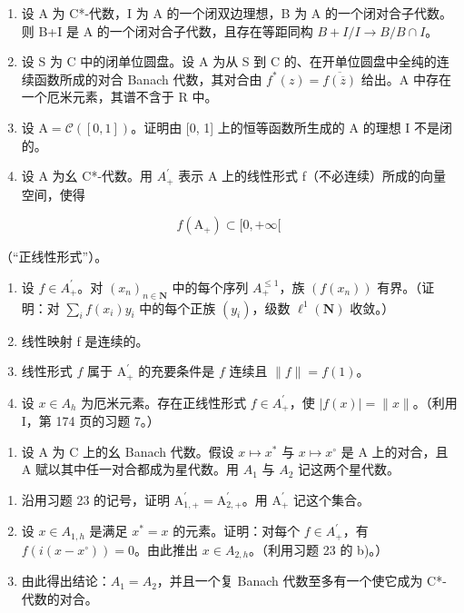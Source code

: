 \begin{enumerate}
\def\labelenumi{\arabic{enumi})}
\setcounter{enumi}{19}
\item
  设 A 为 C*-代数，I 为 A 的一个闭双边理想，B 为 A 的一个闭对合子代数。则 B+I 是 A 的一个闭对合子代数，且存在等距同构 \(B + I/I \rightarrow B/B \cap I\)。
\item
  设 S 为 C 中的闭单位圆盘。设 A 为从 S 到 C 的、在开单位圆盘中全纯的连续函数所成的对合 Banach 代数，其对合由 \(f^{*}(z) = \overline{f(\overline{z})}\) 给出。A 中存在一个厄米元素，其谱不含于 R 中。
\item
  设 \(\mathrm{A} = \mathcal{C}([0,1])\)。证明由 {[}0, 1{]} 上的恒等函数所生成的 A 的理想 I 不是闭的。
\item
  设 A 为幺 C*-代数。用 \(A_{+}^{\prime}\) 表示 A 上的线性形式 f（不必连续）所成的向量空间，使得
\end{enumerate}

\[
f (\mathrm{A} _ {+}) \subset [ 0, + \infty [
\]

（“正线性形式”）。

\begin{enumerate}
\def\labelenumi{\alph{enumi})}
\item
  设 \(f \in A_{+}^{\prime}\)。对 \((x_{n})_{n \in \mathbf{N}}\) 中的每个序列 \(A_{+}^{\leqslant 1}\)，族 \((f(x_{n}))\) 有界。（证明：对 \(\sum_{i} f(x_{i})y_{i}\) 中的每个正族 \((y_{i})\)，级数 \(\ell^{1}(\mathbf{N})\) 收敛。）
\item
  线性映射 f 是连续的。
\item
  线性形式 \(f\) 属于 \(\mathrm{A}_{+}^{\prime}\) 的充要条件是 \(f\) 连续且 \(\| f \| = f(1)\)。
\item
  设 \(x \in A_{h}\) 为厄米元素。存在正线性形式 \(f \in A_{+}^{\prime}\)，使 \(|f(x)| = \|x\|\)。（利用 I，第 174 页的习题 7。）
\end{enumerate}

\begin{enumerate}
\def\labelenumi{\arabic{enumi})}
\setcounter{enumi}{23}
\tightlist
\item
  设 A 为 C 上的幺 Banach 代数。假设 \(x \mapsto x^{*}\) 与 \(x \mapsto x^{\circ}\) 是 A 上的对合，且 A 赋以其中任一对合都成为星代数。用 \(A_{1}\) 与 \(A_{2}\) 记这两个星代数。
\end{enumerate}

\begin{enumerate}
\def\labelenumi{\alph{enumi})}
\item
  沿用习题 23 的记号，证明 \(\mathrm{A}_{1,+}^{\prime} = \mathrm{A}_{2,+}^{\prime}\)。用 \(\mathrm{A}_{+}^{\prime}\) 记这个集合。
\item
  设 \(x \in A_{1,h}\) 是满足 \(x^{*} = x\) 的元素。证明：对每个 \(f \in A_{+}^{\prime}\)，有 \(f(i(x - x^{\circ})) = 0\)。由此推出 \(x \in A_{2,h}\)。（利用习题 23 的 b)。）
\item
  由此得出结论：\(A_{1} = A_{2}\)，并且一个复 Banach 代数至多有一个使它成为 C*-代数的对合。
\end{enumerate}

